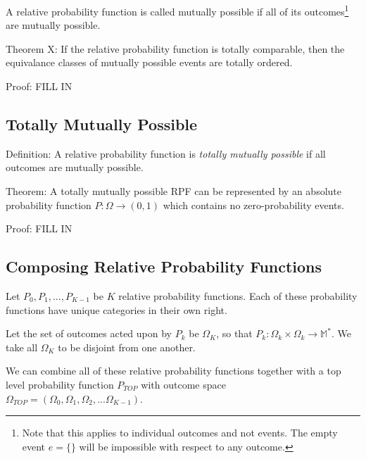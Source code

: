 \documentclass[twoside]{article}
\begin{document}
A relative probability function is called mutually possible if all of its outcomes\footnote{Note that this applies to individual outcomes and not events. The empty event \(e = \{\}\) will be impossible with respect to any outcome.} are mutually possible.

Theorem X: If the relative probability function is totally comparable, then the equivalance classes of mutually possible events are totally ordered.

Proof: FILL IN

\subsection{Totally Mutually Possible}

Definition: A relative probability function is \textit{totally mutually possible} if all outcomes are mutually possible.

Theorem: A totally mutually possible RPF can be represented by an absolute probability function \(P: \Omega \rightarrow (0, 1)\) which contains no zero-probability events.

Proof: FILL IN

\subsection{Composing Relative Probability Functions}

Let \(P_0, P_1, ..., P_{K-1}\) be \(K\) relative probability functions. Each of these probability functions have unique categories in their own right.

Let the set of outcomes acted upon by \(P_k\) be \(\Omega_K\), so that \(P_k: \Omega_k \times \Omega_k \rightarrow \mathbb{M}^{\ast}\). We take all \(\Omega_K\) to be disjoint from one another.

We can combine all of these relative probability functions together with a top level probability function \(P_{TOP}\) with outcome space \(\Omega_{TOP} = (\Omega_0, \Omega_1, \Omega_2, ... \Omega_{K- 1})\).

\end{document}
